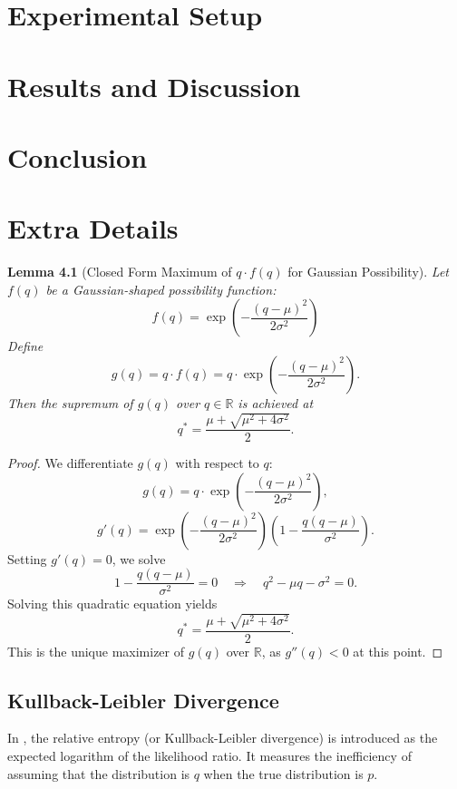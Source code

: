 \documentclass[12pt,a4paper]{report}
\newtheorem{lemma}{Lemma}
\begin{document}
\chapter{Experimental Setup}

\chapter{Results and Discussion}

\chapter{Conclusion}




\appendix

\chapter{Extra Details}

\begin{lemma}[Closed Form Maximum of $q \cdot f(q)$ for Gaussian Possibility]
\label{lem:max_expected_gauss}
Let $f(q)$ be a Gaussian-shaped possibility function: 
\[ f(q) = \exp\left(-\frac{(q - \mu)^2}{2\sigma^2} \right) \]
Define
\[
g(q) = q \cdot f(q) = q \cdot \exp\left(-\frac{(q - \mu)^2}{2\sigma^2} \right).
\]
Then the supremum of \( g(q) \) over \( q \in \mathbb{R} \) is achieved at
\[
q^* = \frac{\mu + \sqrt{\mu^2 + 4\sigma^2}}{2}.
\]
\end{lemma}

\begin{proof}
We differentiate \( g(q) \) with respect to \( q \):
\[
g(q) = q \cdot \exp\left(-\frac{(q - \mu)^2}{2\sigma^2} \right),
\]
\[
g'(q) = \exp\left(-\frac{(q - \mu)^2}{2\sigma^2} \right) \left( 1 - \frac{q(q - \mu)}{\sigma^2} \right).
\]
Setting \( g'(q) = 0 \), we solve
\[
1 - \frac{q(q - \mu)}{\sigma^2} = 0 \quad \Rightarrow \quad q^2 - \mu q - \sigma^2 = 0.
\]
Solving this quadratic equation yields
\[
q^* = \frac{\mu + \sqrt{\mu^2 + 4\sigma^2}}{2}.
\]
This is the unique maximizer of \( g(q) \) over \( \mathbb{R} \), as \( g''(q) < 0 \) at this point.
\end{proof}


\section*{Kullback-Leibler Divergence} \label{appendix:kl}
In \cite{cover1991}, the relative entropy (or Kullback-Leibler divergence) is introduced as the expected logarithm of the likelihood ratio. It measures the inefficiency of assuming that the distribution is \(q\) when the true distribution is \(p\). 
\end{document}
